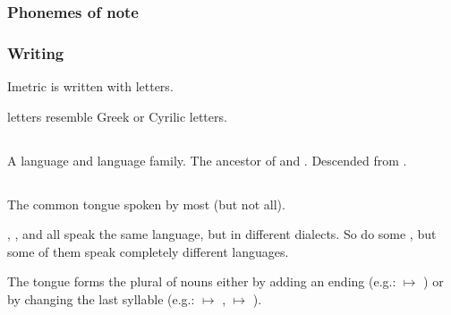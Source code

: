 




\begin{pronunciationenvironment}{\subsubsection{Phonemes of note}}
\end{pronunciationenvironment}





\subsubsection{Writing}
Imetric is written with {\Ortaican{} letters}. 

\Ortaican{} letters resemble Greek or Cyrilic letters. 









\subsection{\Ortaican}
A \scathaese language and language family. 
The ancestor of  and . 
Descended from . 









\subsection{\Resphan}
The common tongue spoken by most \resphain{} (but not all). 

\Mystraacht, \CiriathSepher, \TiphredSerah{} and \Kezerad{} all speak the same language, but in different dialects. 
So do some \Baelzerach, but some of them speak completely different languages. 

The \Resphan{} tongue forms the plural of nouns either by adding an ending (e.g.: \ghobal{} $\mapsto$ \ghobaleth) or by changing the last syllable (e.g.: \resphan{} $\mapsto$ \resphain, \sathariah{} $\mapsto$ \satharioth). 

